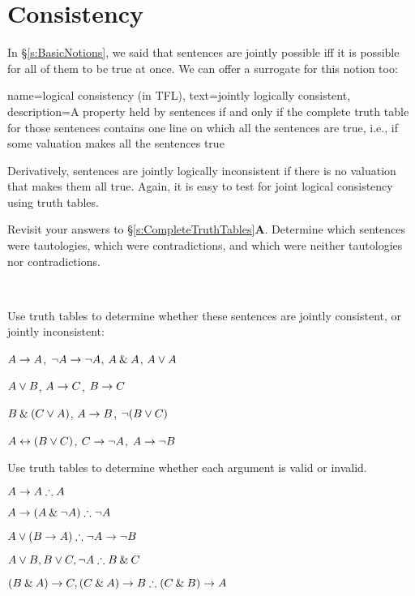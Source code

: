 \section{Consistency}
In \S\ref{s:BasicNotions}, we said that sentences are jointly possible iff it is possible for all of them to be true at once. We can offer a surrogate for this notion too:

{
  name=logical consistency (in TFL),
  text=jointly logically consistent,
description={A property held by sentences if and only if the \gls{complete truth table} for those sentences contains one line on which all the sentences are true, i.e., if some \gls{valuation} makes all the sentences true}
}

Derivatively, sentences are jointly logically inconsistent if there is no valuation that makes them all true. Again, it is easy to test for joint logical consistency using truth tables.




\practiceproblems
\problempart
Revisit your answers to \S\ref{s:CompleteTruthTables}\textbf{A}. Determine which sentences were tautologies, which were contradictions, and which were neither tautologies nor contradictions.
\solutions

\

\problempart
\label{pr.TT.consistent}
Use truth tables to determine whether these sentences are jointly consistent, or jointly inconsistent:
\begin{earg}
\item $A\rightarrow A$, $\neg A \rightarrow \neg A$, $A\mathbin{\&} A$, $A\vee A$ %
\item $A\vee B$, $A\rightarrow C$, $B\rightarrow C$ %
\item $B\mathbin{\&}(C\vee A)$, $A\rightarrow B$, $\neg(B\vee C)$  %
\item $A\leftrightarrow(B\vee C)$, $C\rightarrow \neg A$, $A\rightarrow \neg B$ %
\end{earg}


\solutions
\problempart
\label{pr.TT.valid}
Use truth tables to determine whether each argument is valid or invalid.
\begin{earg}
\item $A\eif A \therefore A$ %
\item $A\eif(A\eand\enot A) \therefore \enot A$ %
\item $A\eor(B\eif A) \therefore \enot A \eif \enot B$ %
\item $A\eor B, B\eor C, \enot A \therefore B \eand C$ %
\item $(B\eand A)\eif C, (C\eand A)\eif B \therefore (C\eand B)\eif A$ %
\end{earg}

